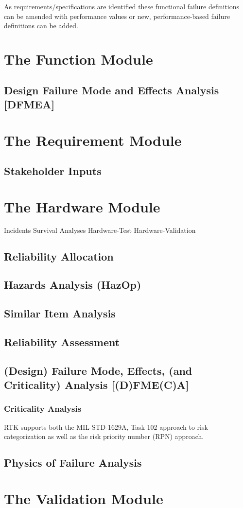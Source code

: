\documentclass[twoside,12pt,letterpaper,openright]{book}
\begin{document}
\noindent As requirements/specifications are identified these functional
failure definitions can be amended with performance values or new,
performance-based failure definitions can be added.

\section{The Function Module}
\subsection{Design Failure Mode and Effects Analysis [DFMEA]}
\section{The Requirement Module}
\subsection{Stakeholder Inputs}
\section{The Hardware Module}

Incidents
Survival Analyses
Hardware-Test
Hardware-Validation

\subsection{Reliability Allocation}
\subsection{Hazards Analysis (HazOp)}
\subsection{Similar Item Analysis}
\subsection{Reliability Assessment}
\subsection{(Design) Failure Mode, Effects, (and Criticality) Analysis [(D)FME(C)A]}
\subsubsection{Criticality Analysis}

\noindent RTK supports both the MIL-STD-1629A, Task 102 approach to risk
categorization as well as the risk priority number (RPN) approach.

\subsection{Physics of Failure Analysis}
\section{The Validation Module}
\end{document}
